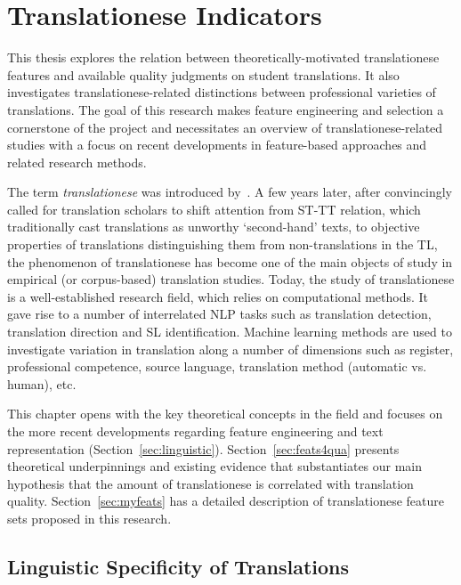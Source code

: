 \chapter{\label{cha:indicators}Translationese Indicators}
This thesis explores the relation between theoretically-motivated translationese features and available quality judgments on student translations. It also investigates translationese-related distinctions between professional varieties of translations. 
The goal of this research makes feature engineering and selection a cornerstone of the project and necessitates an overview of translationese-related studies with a focus on recent developments in feature-based approaches and related research methods.

The term \textit{translationese} was introduced by~\citet{Gellerstam1986}. A few years later, after \citet{Baker1993} convincingly called for translation scholars to shift attention from \gls{ST}-\gls{TT} relation, which traditionally cast translations as unworthy `second-hand' texts, to objective properties of translations distinguishing them from non-translations in the TL, the phenomenon of translationese has become one of the main objects of study in empirical (or corpus-based) translation studies. 
Today, the study of translationese is a well-established research field, which relies on computational methods. It gave rise to a number of interrelated \gls{NLP} tasks such as translation detection, translation direction and SL identification. Machine learning methods are used to investigate variation in translation along a number of dimensions such as register, professional competence, source language, translation method (automatic vs. human), etc.

This chapter opens with the key theoretical concepts in the field and focuses on the more recent developments regarding feature engineering and text representation (Section~\ref{sec:linguistic}). Section~\ref{sec:feats4qua} presents theoretical underpinnings and existing evidence that substantiates our main hypothesis that the amount of translationese is correlated with translation quality. Section~\ref{sec:myfeats} has a detailed description of translationese feature sets proposed in this research.  

\section{\label{sec:linguistic}Linguistic Specificity of Translations}
